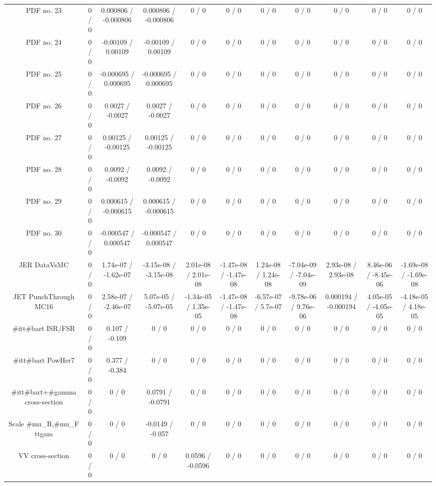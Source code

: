 \begin{table}[htbp]
\begin{center}
\begin{tabular}{|c|c|c|c|c|c|c|c|c|c|c|}
  PDF no. 23 & 0 / 0 & 0.000806 / -0.000806 & 0.000806 / -0.000806 & 0 / 0 & 0 / 0 & 0 / 0 & 0 / 0 & 0 / 0 & 0 / 0 & 0 / 0 \\ 
  PDF no. 24 & 0 / 0 & -0.00109 / 0.00109 & -0.00109 / 0.00109 & 0 / 0 & 0 / 0 & 0 / 0 & 0 / 0 & 0 / 0 & 0 / 0 & 0 / 0 \\ 
  PDF no. 25 & 0 / 0 & -0.000695 / 0.000695 & -0.000695 / 0.000695 & 0 / 0 & 0 / 0 & 0 / 0 & 0 / 0 & 0 / 0 & 0 / 0 & 0 / 0 \\ 
  PDF no. 26 & 0 / 0 & 0.0027 / -0.0027 & 0.0027 / -0.0027 & 0 / 0 & 0 / 0 & 0 / 0 & 0 / 0 & 0 / 0 & 0 / 0 & 0 / 0 \\ 
  PDF no. 27 & 0 / 0 & 0.00125 / -0.00125 & 0.00125 / -0.00125 & 0 / 0 & 0 / 0 & 0 / 0 & 0 / 0 & 0 / 0 & 0 / 0 & 0 / 0 \\ 
  PDF no. 28 & 0 / 0 & 0.0092 / -0.0092 & 0.0092 / -0.0092 & 0 / 0 & 0 / 0 & 0 / 0 & 0 / 0 & 0 / 0 & 0 / 0 & 0 / 0 \\ 
  PDF no. 29 & 0 / 0 & 0.000615 / -0.000615 & 0.000615 / -0.000615 & 0 / 0 & 0 / 0 & 0 / 0 & 0 / 0 & 0 / 0 & 0 / 0 & 0 / 0 \\ 
  PDF no. 30 & 0 / 0 & -0.000547 / 0.000547 & -0.000547 / 0.000547 & 0 / 0 & 0 / 0 & 0 / 0 & 0 / 0 & 0 / 0 & 0 / 0 & 0 / 0 \\ 
  JER DataVsMC & 0 / 0 & 1.74e-07 / -1.62e-07 & -3.15e-08 / -3.15e-08 & 2.01e-08 / 2.01e-08 & -1.47e-08 / -1.47e-08 & 1.24e-08 / 1.24e-08 & -7.04e-09 / -7.04e-09 & 2.93e-08 / 2.93e-08 & 8.46e-06 / -8.45e-06 & -1.69e-08 / -1.69e-08 \\ 
  JET PunchThrough MC16 & 0 / 0 & 2.58e-07 / -2.46e-07 & 5.07e-05 / -5.07e-05 & -1.34e-05 / 1.35e-05 & -1.47e-08 / -1.47e-08 & -6.57e-07 / 5.7e-07 & -9.78e-06 / 9.76e-06 & 0.000194 / -0.000194 & 4.05e-05 / -4.05e-05 & -4.18e-05 / 4.18e-05 \\ 
  #it{t#bar{t}} ISR/FSR & 0 / 0 & 0.107 / -0.109 & 0 / 0 & 0 / 0 & 0 / 0 & 0 / 0 & 0 / 0 & 0 / 0 & 0 / 0 & 0 / 0 \\ 
  #it{t#bar{t}} PowHer7 & 0 / 0 & 0.377 / -0.384 & 0 / 0 & 0 / 0 & 0 / 0 & 0 / 0 & 0 / 0 & 0 / 0 & 0 / 0 & 0 / 0 \\ 
  #it{t#bar{t}}+#gamma cross-section & 0 / 0 & 0 / 0 & 0.0791 / -0.0791 & 0 / 0 & 0 / 0 & 0 / 0 & 0 / 0 & 0 / 0 & 0 / 0 & 0 / 0 \\ 
  Scale #mu_{R},#mu_{F} ttgam & 0 / 0 & 0 / 0 & -0.0149 / -0.057 & 0 / 0 & 0 / 0 & 0 / 0 & 0 / 0 & 0 / 0 & 0 / 0 & 0 / 0 \\ 
  VV cross-section & 0 / 0 & 0 / 0 & 0 / 0 & 0.0596 / -0.0596 & 0 / 0 & 0 / 0 & 0 / 0 & 0 / 0 & 0 / 0 & 0 / 0 \\ 

\end{tabular}
\end{center}
\end{table}
